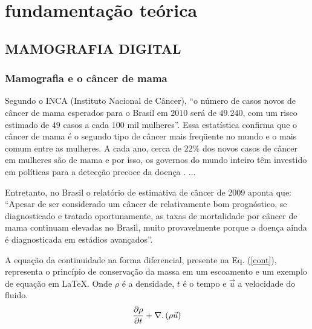 \chapter[FUNDAMENTAÇÃO TEÓRICA]{\textbf {fundamentação teórica}}
\section[MAMOGRAFIA DIGITAL]{MAMOGRAFIA DIGITAL}
\subsection[Mamografia e o câncer de mama]{\textbf{Mamografia e o câncer de mama}}

Segundo o INCA (Instituto Nacional de Câncer), “o número de casos novos de câncer de
mama esperados para o Brasil em $2010$ será de $49.240$, com um risco estimado de $49$ casos
a cada $100$ mil mulheres”. Essa estatística confirma que o câncer de mama é o segundo
tipo de câncer mais freqüente no mundo e o mais comum entre as mulheres. A cada ano,
cerca de $22\%$ dos novos casos de câncer em mulheres são de mama e por isso, os governos
do mundo inteiro têm investido em políticas para a detecção precoce da doença \cite{inca}. $\ldots$

Entretanto, no Brasil o relatório de estimativa de câncer de 2009 aponta que: “Apesar
de ser considerado um câncer de relativamente bom prognóstico, se diagnosticado e tratado
oportunamente, as taxas de mortalidade por câncer de mama continuam elevadas no Brasil,
muito provavelmente porque a doença ainda é diagnosticada em estádios avançados”.

A equação da continuidade na forma diferencial, presente na Eq. (\ref{cont}), representa o
princípio de conservação da massa em um escoamento e um exemplo de equação em LaTeX.
Onde $\rho$ é a densidade, $t$ é o tempo e $\vec{u}$ a velocidade do fluido.
\begin{equation}
\label{cont}
\frac{\partial \rho}{\partial t} + \nabla \ldotp (\rho \vec{u}) 
\end{equation}